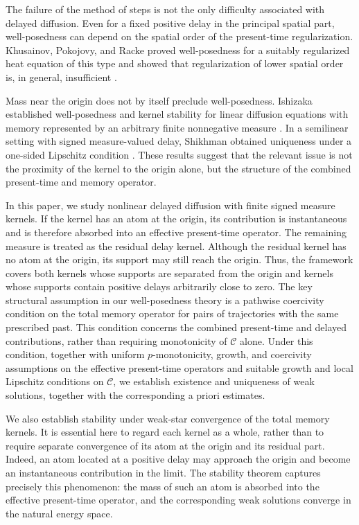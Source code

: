 \documentclass[a4paper,11pt,oneside,reqno]{amsart}
\newcounter{c}
\newcounter{d}
\newcounter{b}
\begin{document}
The failure of the method of steps is not the only difficulty associated
with delayed diffusion. Even for a fixed positive delay in the principal
spatial part, well-posedness can depend on the spatial order of the
present-time regularization. Khusainov, Pokojovy, and Racke proved
well-posedness for a suitably regularized heat equation of this type and
showed that regularization of lower spatial order is, in general, insufficient
\cite{KhusainovPokojovyRacke2015StrongMildExtrapolatedL2SolutionsHeatEquationConstantDelay}.

Mass near the origin does not by itself preclude well-posedness. Ishizaka
established well-posedness and kernel stability for linear diffusion
equations with memory represented by an arbitrary finite nonnegative measure
\cite{Ishizaka2026WellPosednessKernelStabilityMixedMeasureMemory}.
In a semilinear setting with signed measure-valued delay, Shikhman obtained
uniqueness under a one-sided Lipschitz condition
\cite{Shikhman2026KernelRobustDynamicsMeasureValuedDelay}.
These results suggest that the relevant issue is not the proximity of the
kernel to the origin alone, but the structure of the combined present-time
and memory operator.

In this paper, we study nonlinear delayed diffusion with finite signed
measure kernels. If the kernel has an atom at the origin, its contribution
is instantaneous and is therefore absorbed into an effective present-time
operator. The remaining measure is treated as the residual delay kernel.
Although the residual kernel has no atom at the origin, its support may
still reach the origin. Thus, the framework covers both kernels whose
supports are separated from the origin and kernels whose supports contain
positive delays arbitrarily close to zero. The key structural assumption in
our well-posedness theory is a pathwise coercivity condition on the total
memory operator for pairs of trajectories with the same prescribed past.
This condition concerns the combined present-time and delayed contributions,
rather than requiring monotonicity of \(\mathcal C\) alone. Under this
condition, together with uniform \(p\)-monotonicity, growth, and coercivity
assumptions on the effective present-time operators and suitable growth and
local Lipschitz conditions on \(\mathcal C\), we establish existence and
uniqueness of weak solutions, together with the corresponding a priori
estimates.

We also establish stability under weak-star convergence of the total memory
kernels. It is essential here to regard each kernel as a whole, rather than
to require separate convergence of its atom at the origin and its residual
part. Indeed, an atom located at a positive delay may approach the origin
and become an instantaneous contribution in the limit. The stability
theorem captures precisely this phenomenon: the mass of such an atom is
absorbed into the effective present-time operator, and the corresponding
weak solutions converge in the natural energy space.
\end{document}
